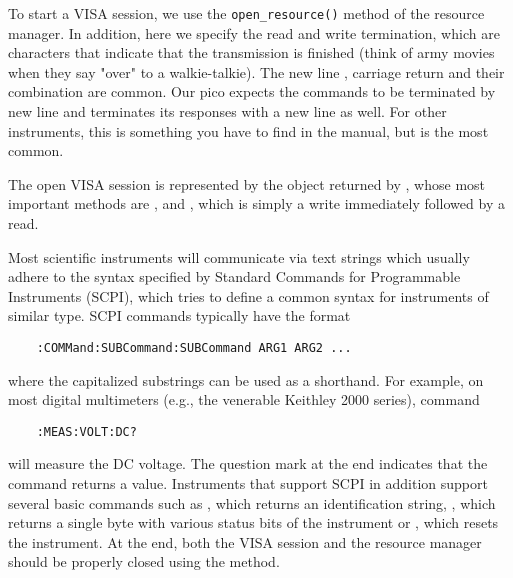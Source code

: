 To start a VISA session, we use the \lstinline|open_resource()| method of the resource manager. In addition, here we specify the read and write termination, which are characters that indicate that the transmission is finished (think of army movies when they say "over" to a walkie-talkie). The new line , carriage return  and their combination  are common. Our pico expects the commands to be terminated by new line  and terminates its responses with a new line as well. For other instruments, this is something you have to find in the manual, but  is the most common.

The open VISA session is represented by the object  returned by , whose most important methods are ,  and , which is simply a write immediately followed by a read.

Most scientific instruments will communicate via text strings which usually adhere to the syntax specified by Standard Commands for Programmable Instruments (SCPI), which tries to define a common syntax for instruments of similar type. SCPI commands typically have the format
\begin{lstlisting}
    :COMMand:SUBCommand:SUBCommand ARG1 ARG2 ...
\end{lstlisting}
where the capitalized substrings can be used as a shorthand. For example, on most digital multimeters (e.g., the venerable Keithley 2000 series), command
\begin{lstlisting}
    :MEAS:VOLT:DC?
\end{lstlisting}
will measure the DC voltage. The question mark at the end indicates that the command returns a value. Instruments that support SCPI in addition support several basic commands such as , which returns an identification string, , which returns a single byte with various status bits of the instrument or , which resets the instrument. At the end, both the VISA session and the resource manager should be properly closed using the  method.

